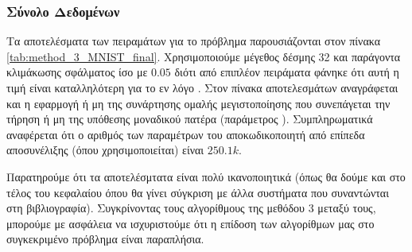 \subsubsection{Σύνολο Δεδομένων }

Τα αποτελέσματα των πειραμάτων για το πρόβλημα  παρουσιάζονται στον πίνακα \ref{tab:method_3_MNIST_final}. Χρησιμοποιούμε μέγεθος δέσμης 32 και παράγοντα κλιμάκωσης σφάλματος ίσο με $0.05$ διότι από επιπλέον πειράματα φάνηκε ότι αυτή η τιμή είναι καταλληλότερη για το εν λόγο . Στον πίνακα αποτελεσμάτων αναγράφεται και η εφαρμογή ή μη της συνάρτησης ομαλής μεγιστοποίησης που συνεπάγεται την τήρηση ή μη της υπόθεσης μοναδικού πατέρα (παράμετρος ). Συμπληρωματικά αναφέρεται ότι ο αριθμός των παραμέτρων του αποκωδικοποιητή από επίπεδα αποσυνέλιξης (όπου χρησιμοποιείται) είναι $250.1k$.

\begin{table}[h]
    \begin{center}
    \end{center}
    \caption[]{\label{tab:method_3_MNIST_final}Επίδοση των αλγορίθμων της μεθόδου 3 στο σύνολο δεδομένων , όταν χρησιμοποιούνται 30 εποχές για την εκπαίδευση του μοντέλου με μέγεθος δέσμης 32. Το αποτέλεσμα με αστερίσκο προέκυψε μετά από 60 εποχές.} 
\end{table}

Παρατηρούμε ότι τα αποτελέσμτατα είναι πολύ ικανοποιητικά (όπως θα δούμε και στο τέλος του κεφαλαίου όπου θα γίνει σύγκριση με άλλα συστήματα που συναντώνται στη βιβλιογραφία). Συγκρίνοντας τους αλγορίθμους της μεθόδου 3 μεταξύ τους, μπορούμε με ασφάλεια να ισχυριστούμε ότι η επίδοση των αλγορίθμων μας στο συγκεκριμένο πρόβλημα είναι παραπλήσια. \par

